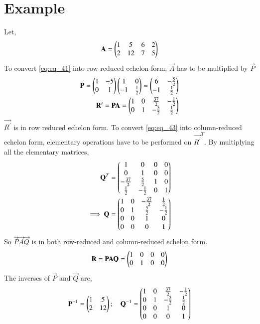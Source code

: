 \documentclass[journal,12pt,twocolumn]{IEEEtran}
\begin{document}
\section{Example}
Let,
\begin{align} \label{eq:eq_41}
    \mathbf{A} = \begin{pmatrix}1 & 5 & 6 & 2 \\ 2 & 12 & 7 & 5\end{pmatrix}
\end{align}
To convert \eqref{eq:eq_41} into row reduced echelon form, $\vec{A}$ has to be multiplied by $\vec{P}$
\begin{align}
    \mathbf{P} = \begin{pmatrix}1 & -5 \\ 0 & 1\end{pmatrix}\begin{pmatrix}1 & 0 \\ -1 & \frac{1}{2}\end{pmatrix} = \begin{pmatrix}6 & -\frac{5}{2} \\ -1 & \frac{1}{2}\end{pmatrix}  \label{eq:eq_42} \\
    \mathbf{R^{\prime}} = \mathbf{P}\mathbf{A} = \begin{pmatrix}1 & 0 & \frac{37}{2} & -\frac{1}{2} \\ 0 & 1 & -\frac{5}{2} & \frac{1}{2}\end{pmatrix} \label{eq:eq_43}
\end{align}
$\vec{R^{\prime}}$ is in row reduced echelon form. To convert \eqref{eq:eq_43} into column-reduced echelon form, elementary operations have to be performed on ${\vec{R^{\prime}}}^T$. 
By multiplying all the elementary matrices,
\begin{align} 
    \mathbf{Q}^T = \begin{pmatrix}1 & 0 & 0 & 0 \\ 0 & 1 & 0 & 0 \\ -\frac{37}{2} & \frac{5}{2} & 1 & 0 \\ \frac{1}{2} & -\frac{1}{2} & 0 & 1\end{pmatrix} \label{eq:eq_45} \\
    \implies \mathbf{Q} = \begin{pmatrix}1 & 0 & -\frac{37}{2} & \frac{1}{2} \\ 0 & 1 & \frac{5}{2} & -\frac{1}{2} \\ 0 & 0 & 1 & 0 \\ 0 & 0 & 0 & 1\end{pmatrix} \label{eq:eq_46}
\end{align}
So $\vec{P}\vec{A}\vec{Q}$ is in both row-reduced and column-reduced echelon form.
\begin{align} \label{eq:eq_47}
    \mathbf{R} = \mathbf{P}\mathbf{A}\mathbf{Q} = \begin{pmatrix}1 & 0 & 0 & 0 \\ 0 & 1 & 0 & 0\end{pmatrix}
\end{align}
The inverses of $\vec{P}$ and $\vec{Q}$ are,
\begin{align} \label{eq:eq_48}
    \mathbf{P}^{-1} = \begin{pmatrix}1 & 5 \\ 2 & 12\end{pmatrix}; \quad 
    \mathbf{Q}^{-1} = \begin{pmatrix}1 & 0 & \frac{37}{2} & -\frac{1}{2} \\ 0 & 1 & -\frac{5}{2} & \frac{1}{2} \\ 0 & 0 & 1 & 0 \\ 0 & 0 & 0 & 1\end{pmatrix}
\end{align}
\end{document}
